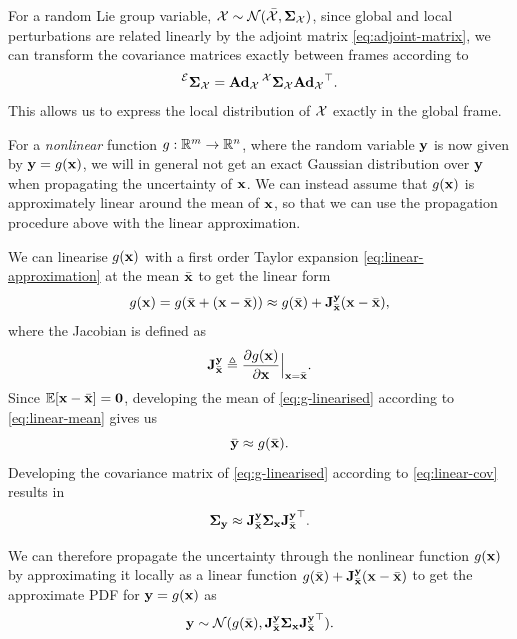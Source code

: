 For a random Lie group variable, $\cX \sim \cN(\bar{\cX}, \matSigma_\cX)$, since global and local perturbations are related linearly by the adjoint matrix \eqref{eq:adjoint-matrix}, we can transform the covariance matrices exactly between frames according to
\begin{equation}
  \prescript{\cE}{}{\matSigma}_\cX = \mAd_\cX \prescript{\cX}{}{\matSigma}_\cX {\mAd_\cX}\trans.
\end{equation}
This allows us to express the local distribution of $\cX$ exactly in the global frame.

For a \emph{nonlinear} function $g: \bbR^m \to \bbR^n$, where the random variable $\vecy$ is now given by $\vecy = g(\vecx)$, we will in general not get an exact Gaussian distribution over $\vecy$ when propagating the uncertainty of $\vecx$.
We can instead assume that $g(\vecx)$ is approximately linear around the mean of $\vecx$, so that we can use the propagation procedure above with the linear approximation.

We can linearise $g(\vecx)$ with a first order Taylor expansion \eqref{eq:linear-approximation} at the mean $\bar{\vecx}$ to get the linear form
\begin{equation} \label{eq:g-linearised}
  g(\vecx) = g(\bar{\vecx}  + (\vecx - \bar{\vecx})) \approx g(\bar{\vecx}) +  \jac{\vecy}{\bar{\vecx}}(\vecx - \bar{\vecx}),
\end{equation}
where the Jacobian is defined as
\begin{equation} \label{eq:noise-linearisation}
  \jac{\vecy}{\bar{\vecx}} \triangleq \dpar{g(\vecx)}{\vecx} \Bigr|_{\vecx = \bar{\vecx}}.
\end{equation}
Since $\bbE[\vecx - \bar{\vecx}] = \matr{0}$, developing the mean of \eqref{eq:g-linearised} according to \eqref{eq:linear-mean} gives us
\begin{equation}
  \bar{\vecy} \approx g(\bar{\vecx}).
\end{equation}
Developing the covariance matrix of \eqref{eq:g-linearised} according to \eqref{eq:linear-cov} results in
\begin{equation}
  \matSigma_\vecy \approx \jac{\vecy}{\bar{\vecx}}  \matSigma_\vecx \jac{\vecy}{\bar{\vecx}}\trans.
\end{equation}

We can therefore propagate the uncertainty through the nonlinear function $g(\vecx)$ by approximating it locally as a linear function $g(\bar{\vecx}) +  \jac{\vecy}{\bar{\vecx}}(\vecx - \bar{\vecx})$ to get the approximate PDF for $\vecy = g(\vecx)$ as
\begin{equation}
  \vecy \sim \cN(g(\bar{\vecx}), \jac{\vecy}{\bar{\vecx}}  \matSigma_\vecx \jac{\vecy}{\bar{\vecx}}\trans).
\end{equation}

